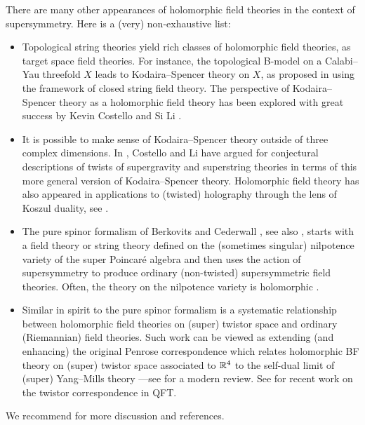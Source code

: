\documentclass[11pt]{amsart}
\begin{document}
There are many other appearances of holomorphic field theories in the context of supersymmetry.
Here is a (very) non-exhaustive list:
\begin{itemize}
\item Topological string theories yield rich classes of holomorphic field theories, as target space field theories. 
For instance, the topological B-model on a Calabi--Yau threefold $X$ leads to Kodaira--Spencer theory on $X$, as proposed in \cite{BCOV} using the framework of closed string field theory. 
The perspective of Kodaira--Spencer theory as a holomorphic field theory has been explored with great success by Kevin Costello and Si Li \cite{CLbcov, CLtypeI}.
\item
It is possible to make sense of Kodaira--Spencer theory outside of three complex dimensions.
In \cite{CLsugra}, Costello and Li have argued for conjectural descriptions of twists of supergravity and superstring theories in terms of this more general version of Kodaira--Spencer theory.
Holomorphic field theory has also appeared in applications to (twisted) holography through the lens of Koszul duality, see \cite{CLsugra, CGholography, CostelloPaquette}.
\item The pure spinor formalism of Berkovits and Cederwall  \cite{Cederwall:2001dx, Berkovits:2005bt}, see also \cite{Eager:2018dsx,perspectives}, starts with a field theory or string theory defined on the (sometimes singular) nilpotence variety of the super Poincar\'e algebra and then uses the action of supersymmetry to produce ordinary (non-twisted) supersymmetric field theories. 
Often, the theory on the nilpotence variety is holomorphic \cite{ESW,SWpure}. 
\item Similar in spirit to the pure spinor formalism is a systematic relationship between holomorphic field theories on (super) twistor space and ordinary (Riemannian) field theories.
Such work can be viewed as extending (and enhancing) the original Penrose correspondence which relates holomorphic BF theory on (super) twistor space associated to $\mathbb R^4$ to the self-dual limit of (super) Yang--Mills theory \cite{Penrose:1969ae, Penrose}---see \cite{adamo2018lecturestwistortheory} for a modern review.
See \cite{Mason, Mason_2009, CostelloTwistor,Bittleston_2023,garner2024scatteringtwistoriallinedefects} for recent work on the twistor correspondence in QFT.
\end{itemize}

We recommend \cite{bah2024panoramaphysicalmathematicsc} for more discussion and references.
\end{document}
